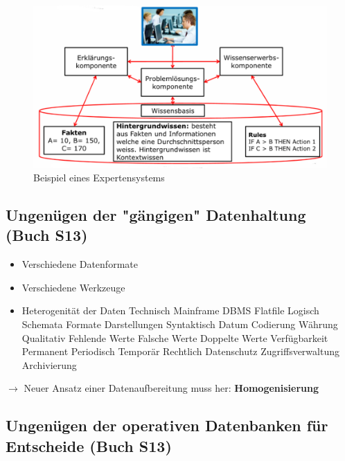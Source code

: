 \documentclass[a4paper, 11pt]{article}
\begin{document}
\begin{figure}[htb]
	\centering
	\includegraphics[keepaspectratio=true,height=18\baselineskip]{expertensystem.png}
	\caption{Beispiel eines Expertensystems}
	\label{fig:xps}
\end{figure}

\newpage

\subsection{Ungenügen der "gängigen" Datenhaltung (Buch S13)}

\begin{itemize}
	\item Verschiedene Datenformate
	\item Verschiedene Werkzeuge
	\item Heterogenität der Daten
		\subitem Technisch
			\subsubitem Mainframe
			\subsubitem DBMS
			\subsubitem Flatfile
		\subitem Logisch
			\subsubitem Schemata
			\subsubitem Formate
			\subsubitem Darstellungen
		\subitem Syntaktisch
			\subsubitem Datum
			\subsubitem Codierung
			\subsubitem Währung
		\subitem Qualitativ
			\subsubitem Fehlende Werte
			\subsubitem Falsche Werte
			\subsubitem Doppelte Werte
		\subitem Verfügbarkeit
			\subsubitem Permanent
			\subsubitem Periodisch
			\subsubitem Temporär
		\subitem Rechtlich
			\subsubitem Datenschutz
			\subsubitem Zugriffsverwaltung
			\subsubitem Archivierung
\end{itemize}

$\longrightarrow$ Neuer Ansatz einer Datenaufbereitung muss her: \textbf{Homogenisierung}

\subsection{Ungenügen der operativen Datenbanken für Entscheide (Buch S13)}
\end{document}
